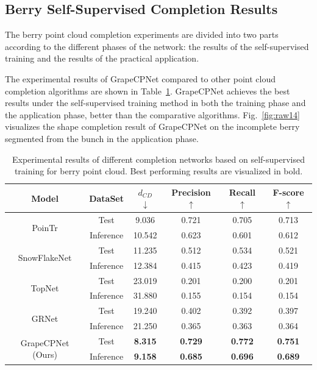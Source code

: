 \documentclass[12pt]{article}
\begin{document}
\subsection{Berry Self-Supervised Completion Results}

The berry point cloud completion experiments are divided into two parts according to the different phases of the network: the results of the self-supervised training and the results of the practical application.

The experimental results of GrapeCPNet compared to other point cloud completion algorithms are shown in Table~\ref{tbl:4}. 
GrapeCPNet achieves the best results under the self-supervised training method in both the training phase and the application phase, better than the comparative algorithms. Fig.~\ref{fig:raw14} visualizes the shape completion result of GrapeCPNet on the incomplete berry segmented from the bunch in the application phase.

\begin{table}[h]
    \centering
    \caption{Experimental results of different completion networks based on self-supervised training for berry point cloud. Best performing results are visualized in bold.}
    \begin{tabular}{cccccc}
        \hline
        \textbf{Model} & \textbf{DataSet} & \textbf{$d_{CD}$ $\downarrow$} & \textbf{Precision $\uparrow$} & \textbf{Recall $\uparrow$} & \textbf{F-score $\uparrow$} \\
        \hline
        \multirow{2}{*}{PoinTr} & Test & 9.036 & 0.721 & 0.705 & 0.713 \\
        \cline{2-6}
        & Inference & 10.542 & 0.623 & 0.601 & 0.612 \\
        \hline
        \multirow{2}{*}{SnowFlakeNet} & Test & 11.235 & 0.512 & 0.534 & 0.521 \\
        \cline{2-6}
        & Inference & 12.384 & 0.415 & 0.423 & 0.419 \\
        \hline
        \multirow{2}{*}{TopNet} & Test & 23.019 & 0.201 & 0.200 & 0.201 \\
        \cline{2-6}
        & Inference & 31.880 & 0.155 & 0.154 & 0.154 \\
        \hline
        \multirow{2}{*}{GRNet} & Test & 19.240 & 0.402 & 0.392 & 0.397 \\
        \cline{2-6}
        & Inference & 21.250 & 0.365 & 0.363 & 0.364 \\
        \hline
        \multirow{2}{*}{GrapeCPNet (Ours)} & Test & \textbf{8.315} & \textbf{0.729} & \textbf{0.772} & \textbf{0.751} \\
        \cline{2-6}
        & Inference & \textbf{9.158} & \textbf{0.685} & \textbf{0.696} & \textbf{0.689} \\
        \hline
    \end{tabular}
    \label{tbl:4}
\end{table}
\end{document}
